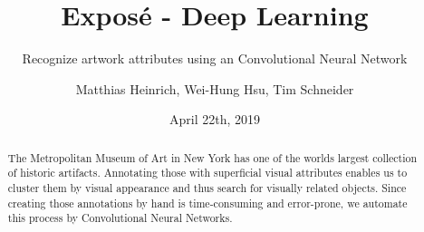 \documentclass[10pt,a4paper,twocolumn,DIV18]{scrartcl}
\title{Expos\'e - Deep Learning}
\subtitle{Recognize artwork attributes using an Convolutional Neural Network}
\author{Matthias Heinrich, Wei-Hung Hsu, Tim Schneider}
\date{April 22th, 2019}
\begin{document}
  

\maketitle
\begin{abstract}
    The Metropolitan Museum of Art in New York has one of the worlds largest collection of historic artifacts.
    Annotating those with superficial visual attributes enables us to cluster them by visual appearance and thus search for visually related objects.
    Since creating those annotations by hand is time-consuming and error-prone, we automate this process by Convolutional Neural Networks.
\end{abstract}






\end{document}
